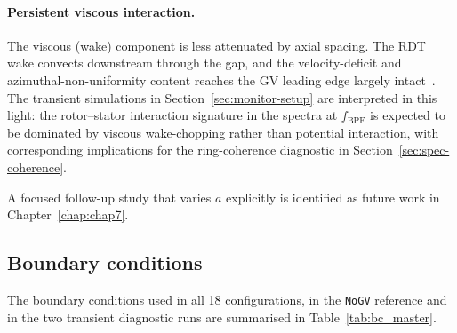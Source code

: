 \paragraph{Persistent viscous interaction.}
The viscous (wake) component is less attenuated by axial spacing. The RDT wake convects downstream through the gap, and the velocity-deficit and azimuthal-non-uniformity content reaches the GV leading edge largely intact~\cite{Korakianitis1989,Duan2019}. The transient simulations in Section~\ref{sec:monitor-setup} are interpreted in this light: the rotor--stator interaction signature in the spectra at $f_{\mathrm{BPF}}$ is expected to be dominated by viscous wake-chopping rather than potential interaction, with corresponding implications for the ring-coherence diagnostic in Section~\ref{sec:spec-coherence}.

A focused follow-up study that varies $a$ explicitly is identified as future work in Chapter~\ref{chap:chap7}.

\subsection{Boundary conditions}
\label{sec:methods_bc}
 
The boundary conditions used in all 18 configurations, in the \texttt{NoGV} reference and in the two transient diagnostic runs are summarised in Table~\ref{tab:bc_master}.
 
